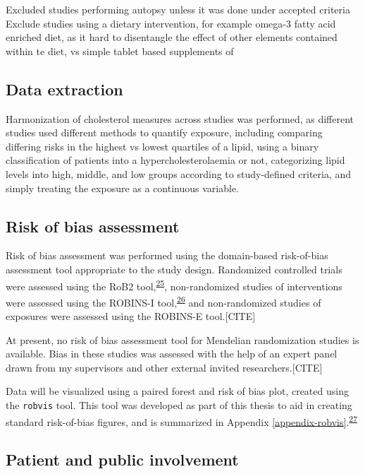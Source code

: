 \documentclass[a4paper, twoside]{templates/ociamthesis}
\begin{document}
Excluded studies performing autopsy unless it was done under accepted criteria
Exclude studies using a dietary intervention, for example omega-3 fatty acid enriched diet, as it hard to disentangle the effect of other elements contained within te diet, vs simple tablet based supplements of

\hypertarget{data-extraction}{%
\subsection{Data extraction}\label{data-extraction}}

Harmonization of cholesterol measures across studies was performed, as different studies used different methods to quantify exposure, including comparing differing risks in the highest vs lowest quartiles of a lipid, using a binary classification of patients into a hypercholesterolaemia or not, categorizing lipid levels into high, middle, and low groups according to study-defined criteria, and simply treating the exposure as a continuous variable.

\hypertarget{risk-of-bias-assessment}{%
\subsection{Risk of bias assessment}\label{risk-of-bias-assessment}}

Risk of bias assessment was performed using the domain-based risk-of-bias assessment tool appropriate to the study design. Randomized controlled trials were assessed using the RoB2 tool,\textsuperscript{\protect\hyperlink{ref-sterne2019}{25}}, non-randomized studies of interventions were assessed using the ROBINS-I tool,\textsuperscript{\protect\hyperlink{ref-sterne2016}{26}} and non-randomized studies of exposures were assessed using the ROBINS-E tool.{[}CITE{]}

At present, no risk of bias assessment tool for Mendelian randomization studies is available. Bias in these studies was assessed with the help of an expert panel drawn from my supervisors and other external invited researchers.{[}CITE{]}

Data will be visualized using a paired forest and risk of bias plot, created using the \texttt{robvis} tool. This tool was developed as part of this thesis to aid in creating standard risk-of-bias figures, and is summarized in Appendix \ref{appendix-robvis}.\textsuperscript{\protect\hyperlink{ref-mcguinness2019}{27}}

\hypertarget{patient-and-public-involvement}{%
\subsection{Patient and public involvement}\label{patient-and-public-involvement}}
\end{document}
